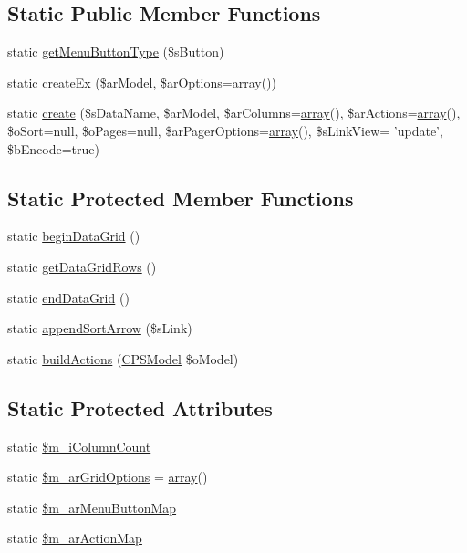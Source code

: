 \subsection*{Static Public Member Functions}
\begin{DoxyCompactItemize}
\item 
static \hyperlink{classCPSDataGrid_acd9b2a44c8b6b5aac349c4577bb0c00c}{getMenuButtonType} (\$sButton)
\item 
static \hyperlink{classCPSDataGrid_aea971c9c726d0e1a6f345c986cca7ded}{createEx} (\$arModel, \$arOptions=\hyperlink{list_8php_aa3205d038c7f8feb5c9f01ac4dfadc88}{array}())
\item 
static \hyperlink{classCPSDataGrid_a4f277aa7b3be8aead6d545302ac7c84b}{create} (\$sDataName, \$arModel, \$arColumns=\hyperlink{list_8php_aa3205d038c7f8feb5c9f01ac4dfadc88}{array}(), \$arActions=\hyperlink{list_8php_aa3205d038c7f8feb5c9f01ac4dfadc88}{array}(), \$oSort=null, \$oPages=null, \$arPagerOptions=\hyperlink{list_8php_aa3205d038c7f8feb5c9f01ac4dfadc88}{array}(), \$sLinkView= 'update', \$bEncode=true)
\end{DoxyCompactItemize}
\subsection*{Static Protected Member Functions}
\begin{DoxyCompactItemize}
\item 
static \hyperlink{classCPSDataGrid_a7b2253a9182458ca0ad1103d6f5ac7ca}{beginDataGrid} ()
\item 
static \hyperlink{classCPSDataGrid_a0ae5d625361f41ef35ce201e37dc7041}{getDataGridRows} ()
\item 
static \hyperlink{classCPSDataGrid_ae3e67a9bbb3458e9757437db4a6d9cb1}{endDataGrid} ()
\item 
static \hyperlink{classCPSDataGrid_a1ca0021fa727c5725d9fd37e87372dad}{appendSortArrow} (\$sLink)
\item 
static \hyperlink{classCPSDataGrid_a8fb3a5e29c0b628c703d714444c975b4}{buildActions} (\hyperlink{classCPSModel}{CPSModel} \$oModel)
\end{DoxyCompactItemize}
\subsection*{Static Protected Attributes}
\begin{DoxyCompactItemize}
\item 
static \hyperlink{classCPSDataGrid_a1ee8c98e418359687d96dff41468fa61}{\$m\_\-iColumnCount}
\item 
static \hyperlink{classCPSDataGrid_acd4ff83641d8c0eac7c449802d557a21}{\$m\_\-arGridOptions} = \hyperlink{list_8php_aa3205d038c7f8feb5c9f01ac4dfadc88}{array}()
\item 
static \hyperlink{classCPSDataGrid_a36b298be9109a11d6fc986b36831f96f}{\$m\_\-arMenuButtonMap}
\item 
static \hyperlink{classCPSDataGrid_aca9359f1c287f1fdc37313507050fe58}{\$m\_\-arActionMap}
\end{DoxyCompactItemize}


